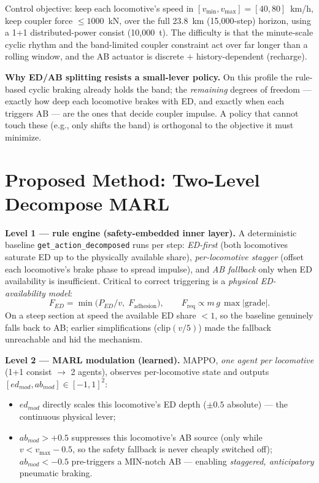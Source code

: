 \documentclass[conference]{IEEEtran}
\begin{document}
Control objective: keep each locomotive's speed in $[v_{\min}, v_{\max}] =
[40, 80]$~km/h, keep coupler force $\le 1000$~kN, over the full 23.8~km
(15{,}000-step) horizon, using a 1+1 distributed-power consist (10{,}000~t).
The difficulty is that the minute-scale cyclic rhythm and the band-limited
coupler constraint act over far longer than a rolling window, and the AB
actuator is discrete $+$ history-dependent (recharge).

\textbf{Why ED/AB splitting resists a small-lever policy.} On this profile the
rule-based cyclic braking already holds the band; the \emph{remaining} degrees
of freedom --- exactly how deep each locomotive brakes with ED, and exactly
when each triggers AB --- are the ones that decide coupler impulse. A policy
that cannot touch these (e.g., only shifts the band) is orthogonal to the
objective it must minimize.

\section{Proposed Method: Two-Level Decompose MARL}
\label{sec:method}

\textbf{Level 1 --- rule engine (safety-embedded inner layer).}
A deterministic baseline \texttt{get\_action\_decomposed} runs per step:
\emph{ED-first} (both locomotives saturate ED up to the physically available
share), \emph{per-locomotive stagger} (offset each locomotive's brake phase to
spread impulse), and \emph{AB fallback} only when ED availability is
insufficient. Critical to correct triggering is a \emph{physical ED-availability
model}:
\begin{equation}
F_{ED}=\min\!\big(P_{ED}/v,\; F_{\text{adhesion}}\big),\qquad
F_{\text{req}} \propto m\,g\,\max|\text{grade}|.
\end{equation}
On a steep section at speed the available ED share $<1$, so the baseline
genuinely falls back to AB; earlier simplifications ($\mathrm{clip}(v/5)$) made
the fallback unreachable and hid the mechanism.

\textbf{Level 2 --- MARL modulation (learned).} MAPPO, \emph{one agent per
locomotive} (1+1 consist $\rightarrow$ 2 agents), observes per-locomotive state
and outputs $[ed_{mod}, ab_{mod}]\in[-1,1]^2$:
\begin{itemize}
\item $ed_{mod}$ directly scales this locomotive's ED depth ($\pm 0.5$
absolute) --- the continuous physical lever;
\item $ab_{mod} > +0.5$ suppresses this locomotive's AB source (only while
$v < v_{\max}-0.5$, so the safety fallback is never cheaply switched off);
$ab_{mod} < -0.5$ pre-triggers a MIN-notch AB --- enabling \emph{staggered,
anticipatory} pneumatic braking.
\end{itemize}
\end{document}
